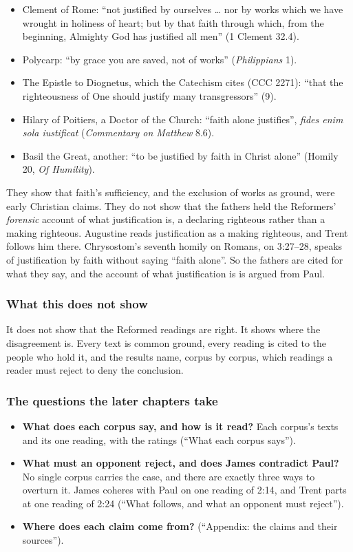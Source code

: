 \documentclass[11pt,paper=\testimonypaper,DIV=13,parskip=false]{scrartcl}
\begin{document}
\begin{itemize}
  \item Clement of Rome: “not justified by ourselves … nor by works which we have wrought in holiness of heart; but by that faith through which, from the beginning, Almighty God has justified all men” (1 Clement 32.4).
  \item Polycarp: “by grace you are saved, not of works” (\emph{Philippians} 1).
  \item The Epistle to Diognetus, which the Catechism cites (CCC 2271): “that the righteousness of One should justify many transgressors” (9).
  \item Hilary of Poitiers, a Doctor of the Church: “faith alone justifies”, \emph{fides enim sola iustificat} (\emph{Commentary on Matthew} 8.6).
  \item Basil the Great, another: “to be justified by faith in Christ alone” (Homily 20, \emph{Of Humility}).
\end{itemize}
They show that faith’s sufficiency, and the exclusion of works as ground, were early Christian claims. They do not show that the fathers held the Reformers’ \emph{forensic} account of what justification is, a declaring righteous rather than a making righteous. Augustine reads justification as a making righteous, and Trent follows him there. Chrysostom’s seventh homily on Romans, on 3:27–28, speaks of justification by faith without saying “faith alone”. So the fathers are cited for what they say, and the account of what justification is is argued from Paul.

\subsubsection*{What this does not show}
It does not show that the Reformed readings are right. It shows where the disagreement is. Every text is common ground, every reading is cited to the people who hold it, and the results name, corpus by corpus, which readings a reader must reject to deny the conclusion.

\subsubsection*{The questions the later chapters take}
\begin{itemize}
  \item \textbf{What does each corpus say, and how is it read?} Each corpus’s texts and its one reading, with the ratings (“What each corpus says”).
  \item \textbf{What must an opponent reject, and does James contradict Paul?} No single corpus carries the case, and there are exactly three ways to overturn it. James coheres with Paul on one reading of 2:14, and Trent parts at one reading of 2:24 (“What follows, and what an opponent must reject”).
  \item \textbf{Where does each claim come from?} (“Appendix: the claims and their sources”).
\end{itemize}
\end{document}
